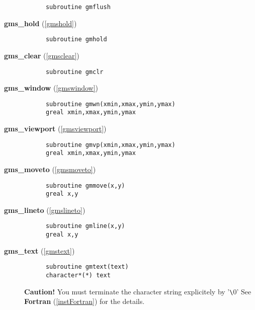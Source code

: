 \begin{description}
\begin{verbatim}
      subroutine gmflush
\end{verbatim}


\item[
{\bf gms\_hold} (\ref{gmshold})]\mbox{}


\begin{verbatim}
      subroutine gmhold
\end{verbatim}


\item[
{\bf gms\_clear} (\ref{gmsclear})]\mbox{}


\begin{verbatim}
      subroutine gmclr
\end{verbatim}


\item[
{\bf gms\_window} (\ref{gmswindow})]\mbox{}


\begin{verbatim}
      subroutine gmwn(xmin,xmax,ymin,ymax)
      greal xmin,xmax,ymin,ymax
\end{verbatim}


\item[
{\bf gms\_viewport} (\ref{gmsviewport})]\mbox{}


\begin{verbatim}
      subroutine gmvp(xmin,xmax,ymin,ymax)
      greal xmin,xmax,ymin,ymax
\end{verbatim}


\item[
{\bf gms\_moveto} (\ref{gmsmoveto})]\mbox{}


\begin{verbatim}
      subroutine gmmove(x,y)
      greal x,y
\end{verbatim}


\item[
{\bf gms\_lineto} (\ref{gmslineto})]\mbox{}


\begin{verbatim}
      subroutine gmline(x,y)
      greal x,y
\end{verbatim}


\item[
{\bf gms\_text} (\ref{gmstext})]\mbox{}


\begin{verbatim}
      subroutine gmtext(text)
      character*(*) text
\end{verbatim}

{\bf Caution!} You must terminate the character string explicitely 
by '\verb+\+0'
See 
{\bf Fortran} (\ref{instFortran}) for the  details.


\end{description}
